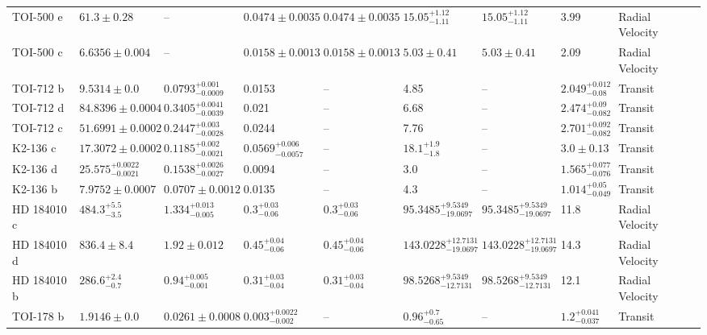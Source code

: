 \begin{tabular}{llllllllll}
TOI-500 e & $61.3 \pm 0.28$ & -- & $0.0474 \pm 0.0035$ & $0.0474 \pm 0.0035$ & $15.05^{+1.12}_{-1.11}$ & $15.05^{+1.12}_{-1.11}$ & 3.99 & Radial Velocity & \cite{SERRANO_ET_AL_2022} \\
TOI-500 c & $6.6356 \pm 0.004$ & -- & $0.0158 \pm 0.0013$ & $0.0158 \pm 0.0013$ & $5.03 \pm 0.41$ & $5.03 \pm 0.41$ & 2.09 & Radial Velocity & \cite{SERRANO_ET_AL_2022} \\
TOI-712 b & $9.5314 \pm 0.0$ & $0.0793^{+0.001}_{-0.0009}$ & 0.0153 & -- & 4.85 & -- & $2.049^{+0.012}_{-0.08}$ & Transit & \cite{VACH_ET_AL__2022} \\
TOI-712 d & $84.8396 \pm 0.0004$ & $0.3405^{+0.0041}_{-0.0039}$ & 0.021 & -- & 6.68 & -- & $2.474^{+0.09}_{-0.082}$ & Transit & \cite{VACH_ET_AL__2022} \\
TOI-712 c & $51.6991 \pm 0.0002$ & $0.2447^{+0.003}_{-0.0028}$ & 0.0244 & -- & 7.76 & -- & $2.701^{+0.092}_{-0.082}$ & Transit & \cite{VACH_ET_AL__2022} \\
K2-136 c & $17.3072 \pm 0.0002$ & $0.1185^{+0.002}_{-0.0021}$ & $0.0569^{+0.006}_{-0.0057}$ & -- & $18.1^{+1.9}_{-1.8}$ & -- & $3.0 \pm 0.13$ & Transit & \cite{MAYO_ET_AL_2023} \\
K2-136 d & $25.575^{+0.0022}_{-0.0021}$ & $0.1538^{+0.0026}_{-0.0027}$ & 0.0094 & -- & 3.0 & -- & $1.565^{+0.077}_{-0.076}$ & Transit & \cite{MAYO_ET_AL_2023} \\
K2-136 b & $7.9752 \pm 0.0007$ & $0.0707 \pm 0.0012$ & 0.0135 & -- & 4.3 & -- & $1.014^{+0.05}_{-0.049}$ & Transit & \cite{MAYO_ET_AL_2023} \\
HD 184010 c & $484.3^{+5.5}_{-3.5}$ & $1.334^{+0.013}_{-0.005}$ & $0.3^{+0.03}_{-0.06}$ & $0.3^{+0.03}_{-0.06}$ & $95.3485^{+9.5349}_{-19.0697}$ & $95.3485^{+9.5349}_{-19.0697}$ & 11.8 & Radial Velocity & \cite{TENG_ET_AL_2022} \\
HD 184010 d & $836.4 \pm 8.4$ & $1.92 \pm 0.012$ & $0.45^{+0.04}_{-0.06}$ & $0.45^{+0.04}_{-0.06}$ & $143.0228^{+12.7131}_{-19.0697}$ & $143.0228^{+12.7131}_{-19.0697}$ & 14.3 & Radial Velocity & \cite{TENG_ET_AL_2022} \\
HD 184010 b & $286.6^{+2.4}_{-0.7}$ & $0.94^{+0.005}_{-0.001}$ & $0.31^{+0.03}_{-0.04}$ & $0.31^{+0.03}_{-0.04}$ & $98.5268^{+9.5349}_{-12.7131}$ & $98.5268^{+9.5349}_{-12.7131}$ & 12.1 & Radial Velocity & \cite{TENG_ET_AL_2022} \\
TOI-178 b & $1.9146 \pm 0.0$ & $0.0261 \pm 0.0008$ & $0.003^{+0.0022}_{-0.002}$ & -- & $0.96^{+0.7}_{-0.65}$ & -- & $1.2^{+0.041}_{-0.037}$ & Transit & \cite{LELEU_ET_AL__2024} \\

\end{tabular}
